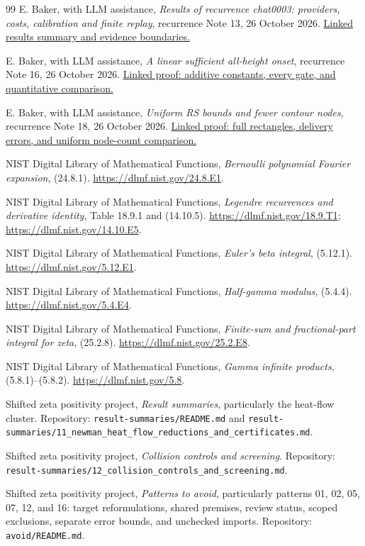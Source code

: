 \begin{thebibliography}{99}
E. Baker, with LLM assistance,
\emph{Results of recurrence chat0003: providers, costs, calibration and finite replay},
recurrence Note 13, 26 October 2026.
\href{run:../../../papers/investigations-5/01_heat_density_asymptotics/recurrence/notes/13_CHAT0003_RESULTS_SUMMARY_20261026.md}{Linked results summary and evidence boundaries.}

E. Baker, with LLM assistance,
\emph{A linear sufficient all-height onset}, recurrence Note 16,
26 October 2026.
\href{run:../../../papers/investigations-5/01_heat_density_asymptotics/recurrence/notes/16_SHARPER_ALL_HEIGHT_ONSET_20261026.md}{Linked proof: additive constants, every gate, and quantitative comparison.}

E. Baker, with LLM assistance,
\emph{Uniform RS bounds and fewer contour nodes}, recurrence Note 18,
26 October 2026.
\href{run:../../../papers/investigations-5/01_heat_density_asymptotics/recurrence/notes/18_UNIFORM_RS_BOUND_STRENGTHENING_20261026.md}{Linked proof: full rectangles, delivery errors, and uniform node-count comparison.}

NIST Digital Library of Mathematical Functions,
\emph{Bernoulli polynomial Fourier expansion}, (24.8.1).
\url{https://dlmf.nist.gov/24.8.E1}.

NIST Digital Library of Mathematical Functions,
\emph{Legendre recurrences and derivative identity},
Table 18.9.1 and (14.10.5).
\url{https://dlmf.nist.gov/18.9.T1};
\url{https://dlmf.nist.gov/14.10.E5}.

NIST Digital Library of Mathematical Functions,
\emph{Euler's beta integral}, (5.12.1).
\url{https://dlmf.nist.gov/5.12.E1}.

NIST Digital Library of Mathematical Functions,
\emph{Half-gamma modulus}, (5.4.4).
\url{https://dlmf.nist.gov/5.4.E4}.

NIST Digital Library of Mathematical Functions,
\emph{Finite-sum and fractional-part integral for zeta}, (25.2.8).
\url{https://dlmf.nist.gov/25.2.E8}.

NIST Digital Library of Mathematical Functions,
\emph{Gamma infinite products}, (5.8.1)--(5.8.2).
\url{https://dlmf.nist.gov/5.8}.

Shifted zeta positivity project,
\emph{Result summaries}, particularly the heat-flow cluster.
Repository: \nolinkurl{result-summaries/README.md} and
\nolinkurl{result-summaries/11_newman_heat_flow_reductions_and_certificates.md}.

Shifted zeta positivity project,
\emph{Collision controls and screening}.
Repository:
\nolinkurl{result-summaries/12_collision_controls_and_screening.md}.

Shifted zeta positivity project,
\emph{Patterns to avoid}, particularly patterns 01, 02, 05, 07,
12, and 16: target reformulations, shared premises, review status,
scoped exclusions, separate error bounds, and unchecked imports.
Repository: \nolinkurl{avoid/README.md}.
\end{thebibliography}
